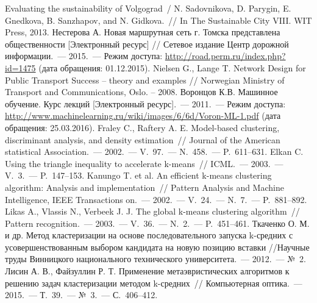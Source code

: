 \renewcommand{\bibname}{%
    \vspace{-.9em}\begin{center}
        Список используемой литературы
    \end{center}\vspace{-2em}
}
\clearpage
{}
{}

\pagestyle{empty}

\begin{thebibliography}{99}
     Evaluating the sustainability of Volgograd~/ N. Sadovnikova, D. Parygin, E. Gnedkova, B. Sanzhapov, and N. Gidkova.~// In The Sustainable City VIII. WIT Press, 2013.
     Нестерова А. Новая маршрутная сеть г. Томска представлена общественности 
        [Электронный ресурс] // Сетевое издание Центр дорожной информации.~--- 2015.~--- Режим доступа: 
        \url{http://road.perm.ru/index.php?id=1475} (дата обращения: 01.12.2015).
     Nielsen G., Lange T. Network Design for Public Transport Success -- theory and 
        examples // Norwegian Ministry of Transport and Communications, Oslo. -- 2008.
     Воронцов К.В. Машинное обучение. Курс лекций [Электронный ресурс].~--- 2011.~--- Режим доступа: \url{http://www.machinelearning.ru/wiki/images/6/6d/Voron-ML-1.pdf} (дата обращения: 25.03.2016).
     Fraley C., Raftery A. E. Model-based clustering, discriminant analysis, and density estimation~// Journal of the American statistical Association.~--- 2002.~--- V.~97.~--- N.~458.~--- P.~611--631.
     Elkan C. Using the triangle inequality to accelerate k-means~// ICML.~--- 2003.~--- V.~3.~--- P.~147--153.
     Kanungo T. et al. An efficient k-means clustering algorithm: Analysis and implementation~// Pattern Analysis and Machine Intelligence, IEEE Transactions on.~--- 2002.~--- V.~24.~--- N.~7.~--- P.~881--892.
     Likas A., Vlassis N., Verbeek J. J. The global k-means clustering algorithm~// Pattern recognition.~--- 2003.~--- V.~36.~--- N.~2.~--- P.~451--461.
     Ткаченко О. М. и др. Метод кластеризации на основе последовательного запуска k-средних с усовершенствованным выбором кандидата на новую позицию вставки //Научные труды Винницкого национального технического университета.~--- 2012.~--- №~2.
     Лисин А. В., Файзуллин Р. Т. Применение метаэвристических алгоритмов к решению задач кластеризации методом k-средних~// Компьютерная оптика.~--- 2015.~--- Т.~39.~--- №~3.~--- С.~406--412.

\end{thebibliography}
